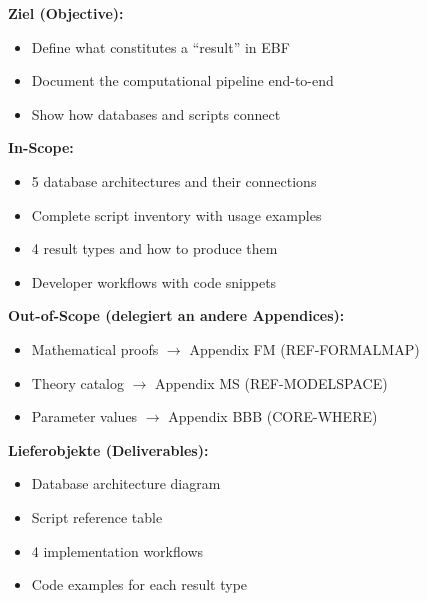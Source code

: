 \begin{tcolorbox}[
    colback=orange!5!white,
    colframe=orange!75!black,
    title={\textbf{Appendix Scope: Ziel / In-Scope / Out-of-Scope / Constraints}},
    fonttitle=\bfseries
]

\textbf{Ziel (Objective):}
\begin{itemize}[nosep]
    \item Define what constitutes a ``result'' in EBF
    \item Document the computational pipeline end-to-end
    \item Show how databases and scripts connect
\end{itemize}

\textbf{In-Scope:}
\begin{itemize}[nosep]
    \item 5 database architectures and their connections
    \item Complete script inventory with usage examples
    \item 4 result types and how to produce them
    \item Developer workflows with code snippets
\end{itemize}

\textbf{Out-of-Scope (delegiert an andere Appendices):}
\begin{itemize}[nosep]
    \item Mathematical proofs $\rightarrow$ Appendix FM (REF-FORMALMAP)
    \item Theory catalog $\rightarrow$ Appendix MS (REF-MODELSPACE)
    \item Parameter values $\rightarrow$ Appendix BBB (CORE-WHERE)
\end{itemize}

\textbf{Lieferobjekte (Deliverables):}
\begin{itemize}[nosep]
    \item Database architecture diagram
    \item Script reference table
    \item 4 implementation workflows
    \item Code examples for each result type
\end{itemize}

\end{tcolorbox}

